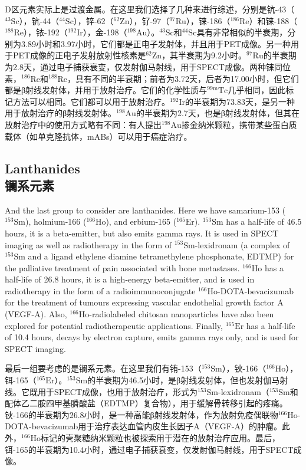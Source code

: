 \documentclass[dvipsnames, svgnames,a4paper,11pt]{article}
\begin{document}
D区元素实际上是过渡金属。在这里我们选择了几种来进行综述，分别是钪-43（\(\mathrm{^{43}Sc}\)），钪-44（\(\mathrm{^{44}Sc}\)），锌-62（\(\mathrm{^{62}Zn}\)），钌-97（\(\mathrm{^{97}Ru}\)），铼-186（\(\mathrm{^{186}Re}\)）和铼-188（\(\mathrm{^{188}Re}\)），铱-192（\(\mathrm{^{192}Ir}\)），金-198（\(\mathrm{^{198}Au}\)）。\(\mathrm{^{43}Sc}\)和\(\mathrm{^{44}Sc}\)具有非常相似的半衰期，分别为3.89小时和3.97小时，它们都是正电子发射体，并且用于PET成像。另一种用于PET成像的正电子发射放射性核素是\(\mathrm{^{62}Zn}\)，其半衰期为9.2小时。\(\mathrm{^{97}Ru}\)的半衰期为2.8天，通过电子捕获衰变，仅发射伽马射线，用于SPECT成像。两种铼同位素，\(\mathrm{^{186}Re}\)和\(\mathrm{^{188}Re}\)，具有不同的半衰期；前者为3.72天，后者为17.00小时，但它们都是β射线发射体，并用于放射治疗。它们的化学性质与\(\mathrm{^{99m}Tc}\)几乎相同，因此标记方法可以相同。它们都可以用于放射治疗。\(\mathrm{^{192}Ir}\)的半衰期为73.83天，是另一种用于放射治疗的β射线发射体。\(\mathrm{^{198}Au}\)的半衰期为2.7天，也是β射线发射体，但其在放射治疗中的使用方式略有不同：有人提出\(\mathrm{^{198}Au}\)掺金纳米颗粒，携带某些蛋白质载体（如单克隆抗体，mABs）可以用于癌症治疗。  

\subsection{Lanthanides \\镧系元素}  

And the last group to consider are lanthanides. Here we have samarium-153 (\(\mathrm{^{153}Sm}\)), holmium-166 (\(\mathrm{^{166}Ho}\)), and erbium-165 (\(\mathrm{^{165}Er}\)). \(\mathrm{^{153}Sm}\) has a half-life of 46.5 hours, it is a beta-emitter, but also emits gamma rays. It is used in SPECT imaging as well as radiotherapy in the form of \(\mathrm{^{153}Sm}\)-lexidronam (a complex of \(\mathrm{^{153}Sm}\) and a ligand ethylene diamine tetramethylene phosphonate, EDTMP) for the palliative treatment of pain associated with bone metastases. \(\mathrm{^{166}Ho}\) has a half-life of 26.8 hours, it is a high-energy beta-emitter, and is used in radiotherapy in the form of a radioimmunoconjugate \(\mathrm{^{166}Ho}\)-DOTA-bevacizumab for the treatment of tumours expressing vascular endothelial growth factor A (VEGF-A). Also, \(\mathrm{^{166}Ho}\)-radiolabeled chitosan nanoparticles have also been explored for potential radiotherapeutic applications. Finally, \(\mathrm{^{165}Er}\) has a half-life of 10.4 hours, decays by electron capture, emits gamma rays only, and is used for SPECT imaging.  

最后一组要考虑的是镧系元素。在这里我们有铕-153（\(\mathrm{^{153}Sm}\)），钬-166（\(\mathrm{^{166}Ho}\)），铒-165（\(\mathrm{^{165}Er}\)）。\(\mathrm{^{153}Sm}\)的半衰期为46.5小时，是β射线发射体，但也发射伽马射线。它既用于SPECT成像，也用于放射治疗，形式为\(\mathrm{^{153}Sm}\)-lexidronam（\(\mathrm{^{153}Sm}\)和配体乙二胺四甲基膦酸盐（EDTMP）复合物），用于缓解骨转移引起的疼痛。钬-166的半衰期为26.8小时，是一种高能β射线发射体，作为放射免疫偶联物\(\mathrm{^{166}Ho}\)-DOTA-bevacizumab用于治疗表达血管内皮生长因子A（VEGF-A）的肿瘤。此外，\(\mathrm{^{166}Ho}\)标记的壳聚糖纳米颗粒也被探索用于潜在的放射治疗应用。最后，铒-165的半衰期为10.4小时，通过电子捕获衰变，仅发射伽马射线，用于SPECT成像。  
\end{document}
